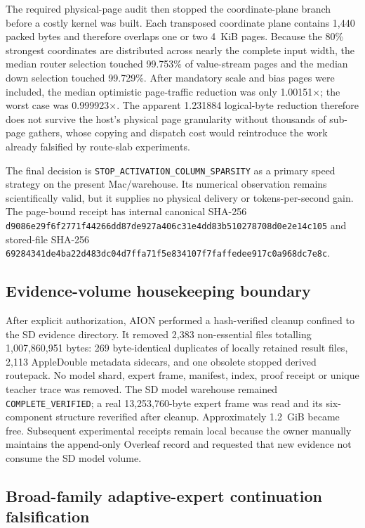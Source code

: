 The required physical-page audit then stopped the coordinate-plane branch
before a costly kernel was built.  Each transposed coordinate plane contains
1,440 packed bytes and therefore overlaps one or two 4~KiB pages.  Because the
80\% strongest coordinates are distributed across nearly the complete input
width, the median router selection touched 99.753\% of value-stream pages and
the median down selection touched 99.729\%.  After mandatory scale and bias
pages were included, the median optimistic page-traffic reduction was only
1.00151$\times$; the worst case was 0.999923$\times$.  The apparent 1.231884
logical-byte reduction therefore does not survive the host's physical page
granularity without thousands of sub-page gathers, whose copying and dispatch
cost would reintroduce the work already falsified by route-slab experiments.

The final decision is
\texttt{STOP\_ACTIVATION\_COLUMN\_SPARSITY} as a primary speed strategy on the
present Mac/warehouse.  Its numerical observation remains scientifically
valid, but it supplies no physical delivery or tokens-per-second gain.  The
page-bound receipt has internal canonical SHA-256
\texttt{d9086e29f6f2771f44266dd87de927a406c31e4dd83b510278708d0e2e14c105}
and stored-file SHA-256
\texttt{69284341de4ba22d483dc04d7ffa71f5e834107f7faffedee917c0a968dc7e8c}.

\subsection{Evidence-volume housekeeping boundary}

After explicit authorization, AION performed a hash-verified cleanup confined
to the SD evidence directory.  It removed 2,383 non-essential files totalling
1,007,860,951 bytes: 269 byte-identical duplicates of locally retained result
files, 2,113 AppleDouble metadata sidecars, and one obsolete stopped derived
routepack.  No model shard, expert frame, manifest, index, proof receipt or
unique teacher trace was removed.  The SD model warehouse remained
\texttt{COMPLETE\_VERIFIED}; a real 13,253,760-byte expert frame was read and
its six-component structure reverified after cleanup.  Approximately 1.2~GiB
became free.  Subsequent experimental receipts remain local because the owner
manually maintains the append-only Overleaf record and requested that new
evidence not consume the SD model volume.

\subsection{Broad-family adaptive-expert continuation falsification}

